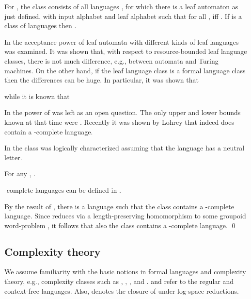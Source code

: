 \documentclass{LMCS}
\begin{document}
\begin{defi}
For , the class  consists of all languages
, for which there is a leaf automaton  as just
defined, with input alphabet  and leaf alphabet  such
that for all ,  iff . If  is  a class of languages then
.
\end{defi}

In \cite{pevo01} the acceptance power of leaf automata with different kinds of leaf languages was examined.
 It was shown that,
with respect to  resource-bounded leaf language classes, there is not much difference, e.g., between automata and Turing
machines.  On the other hand, if the leaf language class is a formal language class then the differences can be huge. In particular, it was shown   that

 while it is known that

 In \cite{pevo01}
the power of   was left as an open question. The only upper
and lower bounds known at that time were .
Recently  it was  shown by Lohrey \cite{loh08} that indeed  does contain a -complete language.

In \cite{MR1908783} the class  was logically characterized assuming that
the language  has a neutral letter.
\begin{thm}[\cite{MR1908783}]\label{neutral}
For any , .
\end{thm}

\begin{cor}\label{Grppspace}-complete languages can be defined in  .
\end{cor}
\proof By the result of  \cite{loh08}, there is a language  such that the class   contains
a   -complete language.  Since  reduces via a length-preserving homomorphism 
to some  groupoid word-problem  \cite{belemc93}, it follows that also the class   contains a  -complete language.
\qed

\subsection{Complexity theory}

We assume familiarity with the basic notions in formal languages and complexity theory, e.g., complexity classes such as , , , and . 
 and  refer to the regular and context-free languages. Also,  denotes the closure of  under log-space reductions.
\end{document}
